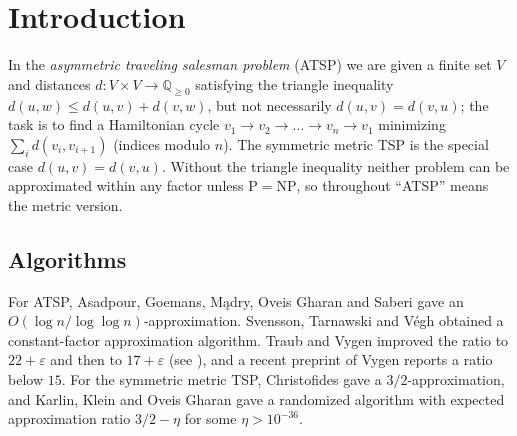 \documentclass[11pt]{amsart}
\theoremstyle{definition}
\theoremstyle{remark}
\numberwithin{equation}{section}
\newcommand{\eps}{\varepsilon}
\begin{document}
\maketitle

\section{Introduction}\label{sec:intro}

In the \emph{asymmetric traveling salesman problem} (ATSP) we are given a finite set $V$ and distances $d\colon V\times V\to\mathbb{Q}_{\geq0}$ satisfying the triangle inequality $d(u,w)\le d(u,v)+d(v,w)$, but not necessarily $d(u,v)=d(v,u)$; the task is to find a Hamiltonian cycle $v_1\to v_2\to\dots\to v_n\to v_1$ minimizing $\sum_i d(v_i,v_{i+1})$ (indices modulo $n$). The symmetric metric TSP is the special case $d(u,v)=d(v,u)$. Without the triangle inequality neither problem can be approximated within any factor unless $\mathrm{P}=\mathrm{NP}$, so throughout ``ATSP'' means the metric version.

\subsection*{Algorithms}
For ATSP, Asadpour, Goemans, M\k{a}dry, Oveis Gharan and Saberi \cite{AGMOS10} gave an $O(\log n/\log\log n)$-approximation. Svensson, Tarnawski and V\'egh \cite{STV20} obtained a constant-factor approximation algorithm. Traub and Vygen improved the ratio to $22+\eps$ \cite{TV22} and then to $17+\eps$ \cite{TV24} (see \cite{Vyg26}), and a recent preprint of Vygen \cite{Vyg26} reports a ratio below $15$. For the symmetric metric TSP, Christofides \cite{Chr76} gave a $3/2$-approximation, and Karlin, Klein and Oveis Gharan \cite{KKO21} gave a randomized algorithm with expected approximation ratio $3/2-\eta$ for some $\eta>10^{-36}$.
\end{document}
